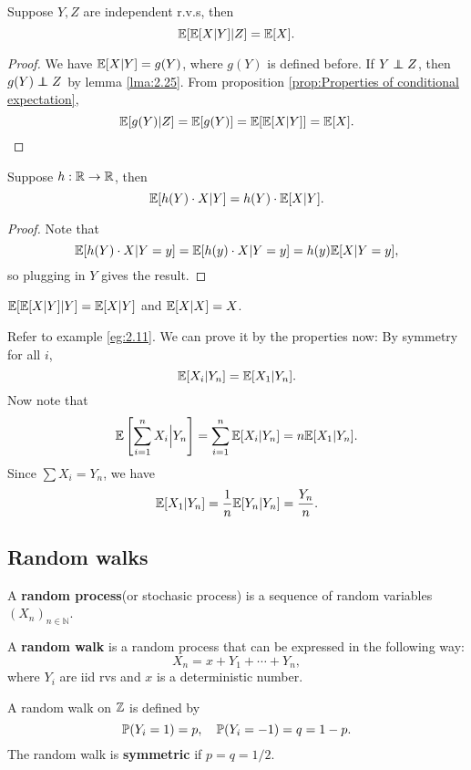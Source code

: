 \begin{proposition}
    Suppose $Y,Z$ are independent r.v.s, then 
    \[
        {\mathbb{E}}[{\mathbb{E}}[X|Y]|Z] = {\mathbb{E}}[X].
    \]
\end{proposition}
\begin{proof}
    We have $ {\mathbb{E}}[X|Y] = g(Y) $, where $g(Y)$ is defined before. If $ Y \independent Z $, then $ g(Y) \independent Z $ by lemma \ref{lma:2.25}. From proposition \ref{prop:Properties of conditional expectation}, 
    \[
        {\mathbb{E}}[g(Y)|Z] = {\mathbb{E}}[g(Y)] = {\mathbb{E}}[{\mathbb{E}}[X|Y]] = {\mathbb{E}}[X].\qedhere
    \]
\end{proof}

\begin{proposition}
    Suppose $h:{\mathbb{R}}\to{\mathbb{R}}$, then 
    \[
        {\mathbb{E}}[h(Y) \cdot X|Y] = h(Y) \cdot {\mathbb{E}}[X|Y].
    \]
\end{proposition}
\begin{proof}
    Note that 
    \[
        {\mathbb{E}}[h(Y)\cdot X|Y=y]={\mathbb{E}}[h(y)\cdot X|Y=y] = h(y){\mathbb{E}}[X|Y=y],
    \]
    so plugging in $Y$ gives the result.
\end{proof}
\begin{corollary}
    $ {\mathbb{E}}[{\mathbb{E}}[X|Y]|Y]={\mathbb{E}}[X|Y] $ and $ {\mathbb{E}}[X|X]=X $.
\end{corollary}

\begin{example}
    Refer to example \ref{eg:2.11}. We can prove it by the properties now: By symmetry for all $i$, 
    \[
        {\mathbb{E}}[X_i|Y_n]={\mathbb{E}}[X_1|Y_n].
    \]
    Now note that 
    \[
        {\mathbb{E}}\left[ \sum_{i=1}^{n}X_i\Big|Y_n \right] = \sum_{i=1}^{n}{\mathbb{E}}[X_i|Y_n] = n {\mathbb{E}}[X_1|Y_n].
    \]
    Since $ \sum X_i = Y_n $, we have 
    \[
        {\mathbb{E}}[X_1|Y_n] = \frac{1}{n}{\mathbb{E}}[Y_n|Y_n] = \frac{Y_n}{n}.\qedhere
    \]
\end{example}

\subsection{Random walks}
\begin{definition}
    A \textbf{random process}(or stochasic process) is a sequence of random variables $ (X_n)_{n\in \mathbb{N}} $.
\end{definition}
\begin{definition}
    A \textbf{random walk} is a random process that can be expressed in the following way: 
    \[
        X_n = x+Y_1+\cdots+Y_n,
    \]
    where $Y_i$ are iid rvs and $x$ is a deterministic number.
\end{definition}
\begin{definition}
    A random walk on ${\mathbb{Z}}$ is defined by 
    \[
        {\mathbb{P}}(Y_i=1) = p,\quad \mathbb{P}(Y_i=-1)=q=1-p.
    \] 
    The random walk is \textbf{symmetric} if $p=q=1/2$.
\end{definition}


